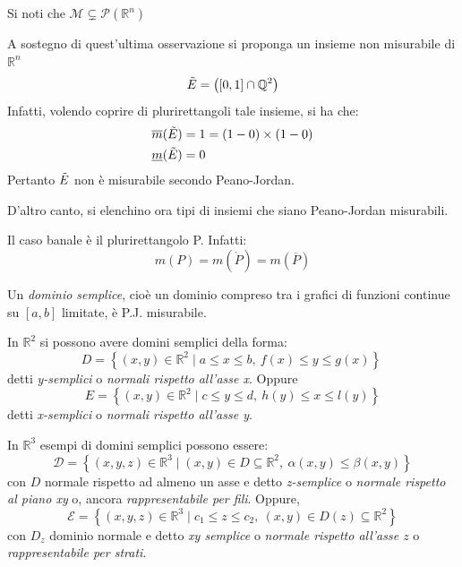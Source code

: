 \begin{oss}
    Si noti che $\mathcal{M} \subsetneq \mathcal{P}(\mathbb{R}^n)$
\end{oss}
\begin{example}
    A sostegno di quest'ultima osservazione si proponga un insieme non misurabile di $\mathbb{R}^n$
    \begin{equation*}
        \Tilde{E}=\left( \left[0,1\right] \cap \mathbb{Q}^2\right)
    \end{equation*}
    Infatti, volendo coprire di plurirettangoli tale insieme, si ha che:
    \begin{align*}
        &\overline{m}(\Tilde{E})=1=(1-0)\times(1-0)\\
        &\underline{m}(\Tilde{E})=0
    \end{align*}
    Pertanto $\Tilde{E}$ non è misurabile secondo Peano-Jordan.
\end{example}
D'altro canto, si elenchino ora tipi di insiemi che siano Peano-Jordan misurabili.
\begin{example}
    Il caso banale è il plurirettangolo P. Infatti:
    \begin{equation*}
    m(P)=m(\mathring{P})=m(\overline{P})       
    \end{equation*}
\end{example}
\begin{example}
    Un \textit{dominio semplice}, cioè un dominio compreso tra i grafici di funzioni continue su $\left[a,b\right]$ limitate, è P.J. misurabile.
    
    In $\mathbb{R}^2$ si possono avere domini semplici della forma:
    \begin{equation*}
            D= \left\{ (x, y) \in \mathbb{R}^2 \mid a \leq x \leq b ,\ f(x)\leq y \leq g(x) \right\}\        
    \end{equation*}
    detti \textit{y-semplici} o \textit{normali rispetto all'asse x}. Oppure
    \begin{equation*}
        E= \left\{(x, y) \in \mathbb{R}^2\mid c \leq y \leq d,\ h(y) \leq x \leq l(y)\right\}
    \end{equation*}
    detti \textit{x-semplici} o \textit{normali rispetto all'asse y}.
    \vspace*{6pt}                       
    
    In $\mathbb{R}^3$ esempi di domini semplici possono essere:
    \begin{equation*}
        \mathcal{D}=\left\{(x,y,z) \in \mathbb{R}^3 \mid (x,y) \in D \subseteq \mathbb{R}^2,\ \alpha(x, y) \leq \beta(x,y) \right\}
    \end{equation*}
    con $D$ normale rispetto ad almeno un asse e detto \textit{z-semplice} o \textit{normale rispetto al piano xy} o, ancora \textit{rappresentabile per fili}. Oppure, 
    \begin{equation*}
        \mathcal{E}=\left\{(x,y,z) \in \mathbb{R}^3 \mid c_1 \leq z \leq c_2,\ (x,y) \in D(z)\subseteq \mathbb{R}^2\right\}
    \end{equation*}
    con $D_z$ dominio normale e detto \textit{xy semplice} o \textit{normale rispetto all'asse $z$} o \textit{rappresentabile per strati}.
\end{example}
